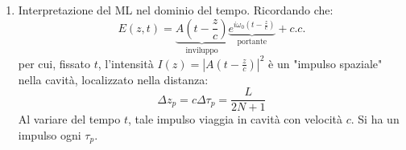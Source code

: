 \documentclass{book}
\def \D {\Delta}
\theoremstyle{remark}
\begin{document}
\begin{enumerate}
\begin{enumerate}
\item Interpretazione del ML nel dominio del tempo.
Ricordando che:
\begin{equation*}
E(z,t) = \underbrace{A\left(t -\frac{z}{c}\right)}_\text{inviluppo} \underbrace{e^{i\omega_0 \left(t - \frac{z}{c}\right)}}_\text{portante} + c.c.
\end{equation*}
per cui, fissato $t$, l'intensità $I(z) = \left|A\left(t-\frac{z}{c}\right)\right|^2$ è un "impulso spaziale" nella cavità, localizzato nella distanza:
\begin{equation*}
\D z_p = c \D\tau_p = \frac{L}{2N+1}
\end{equation*}
Al variare del tempo $t$, tale impulso viaggia in cavità con velocità $c$.
Si ha un impulso ogni $\tau_p$.
\end{enumerate}
\end{enumerate}
\end{document}
